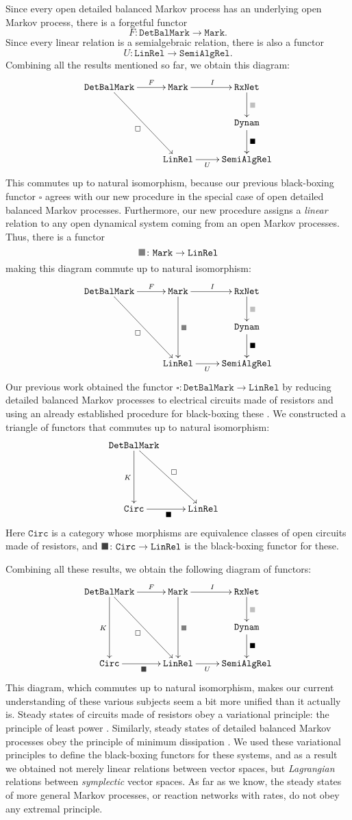 \documentclass{compositionalityarticle}
\newcommand{\RxNet}{\mathtt{RxNet}}
\newcommand{\Dynam}{\mathtt{Dynam}}
\newcommand{\Mark}{\mathtt{Mark}}
\newcommand{\DetBalMark}{\mathtt{DetBalMark}}
\newcommand{\LinRel}{\mathtt{LinRel}}
\newcommand{\SemiAlgRel}{\mathtt{SemiAlgRel}}
\newcommand{\Circ}{\mathtt{Circ}}
\newcommand*{\darkgraysquare}{\textcolor{gray}{\blacksquare}}
\newcommand*{\vdarkgraysquare}{\textcolor{darkgray}{\blacksquare}}
\newcommand*{\graysquare}{\textcolor{lightgray}{\blacksquare}}
\newcommand{\maps}{\colon}
\theoremstyle{compositionality}
\theoremstyle{remark}
\begin{document}
Since every open detailed balanced Markov process has an underlying open Markov process, there is a forgetful functor 
\[     F \maps \DetBalMark \to \Mark . \]
Since every linear relation is a semialgebraic relation, there is also a functor
\[     U \maps \LinRel \to \SemiAlgRel . \]
Combining all the results mentioned so far, we obtain this diagram:
\[ 
\xymatrix{
\DetBalMark \ar[r]^-F \ar[ddr]_{\square} & \Mark \ar[r]^I & \RxNet  \ar[d]^{\graysquare} \\ 
& &   \Dynam \ar[d]^{\blacksquare} \\
& \LinRel \ar[r]_-U & \SemiAlgRel 
}
\]
This commutes up to natural isomorphism, because our previous black-boxing functor $\square$ agrees with our new procedure in the special case of open detailed balanced Markov processes.  Furthermore, our new procedure assigns a \emph{linear} relation to any open dynamical system coming from an open Markov processes.  Thus, there is a functor 
\[           \darkgraysquare \maps \Mark \to \LinRel  \]
making this diagram commute up to natural isomorphism:
\[ 
\xymatrix{
\DetBalMark \ar[r]^-F \ar[ddr]_{\square} & \Mark \ar[r]^I  \ar[dd]^{\darkgraysquare} & \RxNet  \ar[d]^{\graysquare} \\ 
& &   \Dynam \ar[d]^{\blacksquare} \\
& \LinRel \ar[r]_-U & \SemiAlgRel 
}
\]
Our previous work obtained the functor $\square \maps \DetBalMark \to \LinRel$ by reducing
detailed balanced Markov processes to electrical circuits made of resistors and using an already established procedure for black-boxing these \cite{BaezFong}.   We constructed a triangle of functors that commutes up to natural isomorphism:
\[ 
\xymatrix{
\DetBalMark \ar[dd]_K \ar[ddr]^{\square}  \\ 
& &   \\
\Circ \ar[r]_{\blacksquare} & \LinRel 
}
\]
Here $\Circ$ is a category whose morphisms are equivalence classes of open circuits made of
resistors, and $\vdarkgraysquare \maps \Circ \to \LinRel$ is the black-boxing functor for these.

Combining all these results, we obtain the following diagram of functors:
\[ 
\xymatrix{
\DetBalMark \ar[dd]_K \ar[r]^-F \ar[ddr]_{\square} & \Mark \ar[r]^I  \ar[dd]^{\darkgraysquare} & \RxNet  \ar[d]^{\graysquare} \\ 
& &   \Dynam \ar[d]^{\blacksquare} \\
\Circ \ar[r]_{\vdarkgraysquare} & \LinRel \ar[r]_-U & \SemiAlgRel 
}
\]
This diagram, which commutes up to natural isomorphism, makes our current understanding of these various subjects seem a bit more unified than it actually is.  Steady states of circuits made of resistors obey a variational principle: the principle of least power \cite{BaezFong}.  Similarly, steady states of detailed balanced Markov processes obey the principle of minimum dissipation \cite{BaezFongPollard}.  We used these variational principles to define the black-boxing functors for these systems, and as a result we obtained not merely linear relations between vector spaces, but \emph{Lagrangian} relations between \emph{symplectic} vector spaces.  As far as we know, the steady states of more general Markov processes, or reaction networks with rates, do not obey any extremal principle. 
\end{document}
